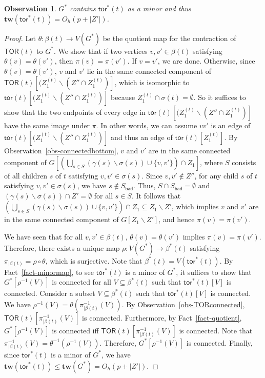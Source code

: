 \documentclass[a4paper,11pt]{article}
\numberwithin{lemma}{section}
\newtheorem{observation}[lemma]{Observation}
\newcommand{\tw}{\mathbf{tw}}
\newcommand{\tor}{\mathsf{tor}}
\begin{document}
\begin{observation}
$G^*$ contains $\tor^*(t)$ as a minor and thus $\tw(\tor^*(t)) = O_h(p+|Z'|)$.
\end{observation}
\begin{proof}
Let $\theta\colon \beta(t) \to V(G^*)$ be the quotient map for the contraction of $\mathsf{TOR}(t)$ to $G^*$.
We show that if two vertices $v,v' \in \beta(t)$ satisfying $\theta(v) = \theta(v')$, then $\pi(v) = \pi(v')$.
If $v = v'$, we are done.
Otherwise, since $\theta(v) = \theta(v')$, $v$ and $v'$ lie in the same connected component of $\mathsf{TOR}(t)[(Z_1^{(t)} \backslash (Z'' \cap Z_1^{(t)})]$, which is isomorphic to $\tor(t)[(Z_1^{(t)} \backslash (Z'' \cap Z_1^{(t)})]$ because $Z_1^{(t)} \cap \sigma(t) = \emptyset$.
So it suffices to show that the two endpoints of every edge in $\tor(t)[(Z_1^{(t)} \backslash (Z'' \cap Z_1^{(t)})]$ have the same image under $\pi$.
In other words, we can assume $vv'$ is an edge of $\tor(t)[(Z_1^{(t)} \backslash (Z'' \cap Z_1^{(t)})]$ and thus an edge of $\tor(t)[Z_1^{(t)}]$.
By Observation~\ref{obs-connectedbottom}, $v$ and $v'$ are in the same connected component of $G[(\bigcup_{s \in S} (\gamma(s) \backslash \sigma(s)) \cup \{v,v'\}) \cap Z_1]$, where $S$ consists of all children $s$ of $t$ satisfying $v,v' \in \sigma(s)$.
Since $v,v' \notin Z''$, for any child $s$ of $t$ satisfying $v,v' \in \sigma(s)$, we have $s \notin S_\mathsf{bad}$.
Thus, $S \cap S_\mathsf{bad} = \emptyset$ and $(\gamma(s) \backslash \sigma(s)) \cap Z' = \emptyset$ for all $s \in S$.
It follows that $(\bigcup_{s \in S} (\gamma(s) \backslash \sigma(s)) \cup \{v,v'\}) \cap Z_1 \subseteq Z_1 \backslash Z'$, which implies $v$ and $v'$ are in the same connected component of $G[Z_1 \backslash Z']$, and hence $\pi(v) = \pi(v')$.

We have seen that for all $v,v' \in \beta(t)$, $\theta(v) = \theta(v')$ implies $\pi(v) = \pi(v')$.
Therefore, there exists a unique map $\rho\colon V(G^*) \to \beta^*(t)$ satisfying $\pi_{|\beta(t)} = \rho \circ \theta$, which is surjective.
Note that $\beta^*(t) = V(\tor^*(t))$.
By Fact~\ref{fact-minormap}, to see $\tor^*(t)$ is a minor of $G^*$, it suffices to show that $G^*[\rho^{-1}(V)]$ is connected for all $V \subseteq \beta^*(t)$ such that $\tor^*(t)[V]$ is connected.
Consider a subset $V \subseteq \beta^*(t)$ such that $\tor^*(t)[V]$ is connected.
We have $\rho^{-1}(V) = \theta(\pi_{|\beta(t)}^{-1}(V))$.
By Observation~\ref{obs-TORconnected}, $\mathsf{TOR}(t)[\pi_{|\beta(t)}^{-1}(V)]$ is connected.
Furthermore, by Fact~\ref{fact-quotient}, $G^*[\rho^{-1}(V)]$ is connected iff $\mathsf{TOR}(t)[\pi_{|\beta(t)}^{-1}(V)]$ is connected.
Note that $\pi_{|\beta(t)}^{-1}(V) = \theta^{-1}(\rho^{-1}(V))$.
Therefore, $G^*[\rho^{-1}(V)]$ is connected.
Finally, since $\tor^*(t)$ is a minor of $G^*$, we have $\tw(\tor^*(t)) \leq \tw(G^*) = O_h(p+|Z'|)$.
\end{proof}
\end{document}
